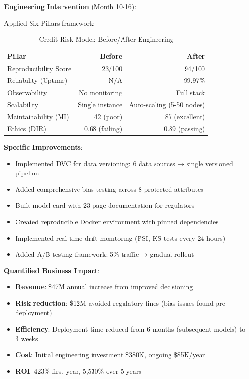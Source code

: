 \textbf{Engineering Intervention} (Month 10-16):

Applied Six Pillars framework:

\begin{table}[h]
\centering
\caption{Credit Risk Model: Before/After Engineering}
\begin{tabular}{lrr}
\toprule
\textbf{Pillar} & \textbf{Before} & \textbf{After} \\
\midrule
Reproducibility Score & 23/100 & 94/100 \\
Reliability (Uptime) & N/A & 99.97\% \\
Observability & No monitoring & Full stack \\
Scalability & Single instance & Auto-scaling (5-50 nodes) \\
Maintainability (MI) & 42 (poor) & 87 (excellent) \\
Ethics (DIR) & 0.68 (failing) & 0.89 (passing) \\
\bottomrule
\end{tabular}
\end{table}

\textbf{Specific Improvements}:
\begin{itemize}
    \item Implemented DVC for data versioning: 6 data sources → single versioned pipeline
    \item Added comprehensive bias testing across 8 protected attributes
    \item Built model card with 23-page documentation for regulators
    \item Created reproducible Docker environment with pinned dependencies
    \item Implemented real-time drift monitoring (PSI, KS tests every 24 hours)
    \item Added A/B testing framework: 5\% traffic → gradual rollout
\end{itemize}

\textbf{Quantified Business Impact}:
\begin{itemize}
    \item \textbf{Revenue}: \$47M annual increase from improved decisioning
    \item \textbf{Risk reduction}: \$12M avoided regulatory fines (bias issues found pre-deployment)
    \item \textbf{Efficiency}: Deployment time reduced from 6 months (subsequent models) to 3 weeks
    \item \textbf{Cost}: Initial engineering investment \$380K, ongoing \$85K/year
    \item \textbf{ROI}: 423\% first year, 5,530\% over 5 years
\end{itemize}

